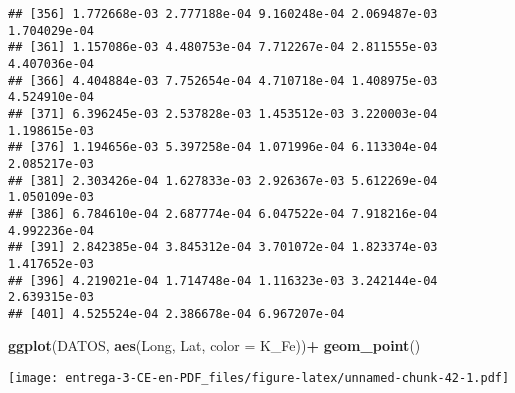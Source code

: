\documentclass[
]{article}
\newenvironment{Shaded}{\begin{snugshade}}{\end{snugshade}}
\newcommand{\DataTypeTok}[1]{\textcolor[rgb]{0.13,0.29,0.53}{#1}}
\newcommand{\DecValTok}[1]{\textcolor[rgb]{0.00,0.00,0.81}{#1}}
\newcommand{\KeywordTok}[1]{\textcolor[rgb]{0.13,0.29,0.53}{\textbf{#1}}}
\newcommand{\NormalTok}[1]{#1}
\newcommand{\OperatorTok}[1]{\textcolor[rgb]{0.81,0.36,0.00}{\textbf{#1}}}
\newcommand{\StringTok}[1]{\textcolor[rgb]{0.31,0.60,0.02}{#1}}
\begin{document}
\begin{verbatim}
## [356] 1.772668e-03 2.777188e-04 9.160248e-04 2.069487e-03 1.704029e-04
## [361] 1.157086e-03 4.480753e-04 7.712267e-04 2.811555e-03 4.407036e-04
## [366] 4.404884e-03 7.752654e-04 4.710718e-04 1.408975e-03 4.524910e-04
## [371] 6.396245e-03 2.537828e-03 1.453512e-03 3.220003e-04 1.198615e-03
## [376] 1.194656e-03 5.397258e-04 1.071996e-04 6.113304e-04 2.085217e-03
## [381] 2.303426e-04 1.627833e-03 2.926367e-03 5.612269e-04 1.050109e-03
## [386] 6.784610e-04 2.687774e-04 6.047522e-04 7.918216e-04 4.992236e-04
## [391] 2.842385e-04 3.845312e-04 3.701072e-04 1.823374e-03 1.417652e-03
## [396] 4.219021e-04 1.714748e-04 1.116323e-03 3.242144e-04 2.639315e-03
## [401] 4.525524e-04 2.386678e-04 6.967207e-04
\end{verbatim}

\begin{Shaded}
\begin{Highlighting}[]
\KeywordTok{ggplot}\NormalTok{(DATOS, }\KeywordTok{aes}\NormalTok{(Long, Lat, }\DataTypeTok{color =}\NormalTok{ K_Fe))}\OperatorTok{+}
\StringTok{  }\KeywordTok{geom_point}\NormalTok{()}
\end{Highlighting}
\end{Shaded}

\texttt{[image: entrega-3-CE-en-PDF\_files/figure-latex/unnamed-chunk-42-1.pdf]}

\begin{Shaded}
\end{Shaded}
\end{document}
